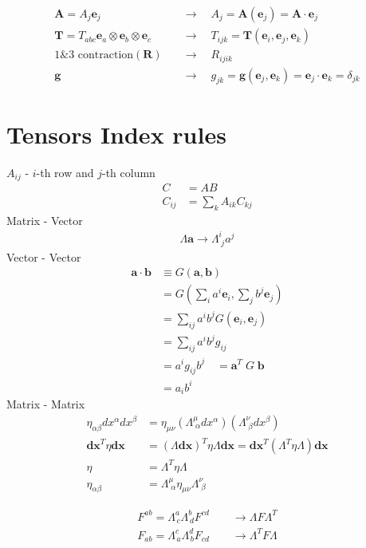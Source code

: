 \documentclass[../main.tex]{subfiles}
\begin{document}
\begin{itemize}
\begin{align}
    \mathbf{A}=A_j\mathbf{e}_j\quad&\rightarrow\quad A_j=\mathbf{A}(\mathbf{e}_j)=\mathbf{A}\cdot\mathbf{e}_j\\
    \mathbf{T}=T_{abc}\mathbf{e}_a\otimes\mathbf{e}_b\otimes\mathbf{e}_c\quad&\rightarrow\quad T_{ijk}=\mathbf{T}(\mathbf{e}_i,\mathbf{e}_j,\mathbf{e}_k)\\
    \text{1\&3 contraction}(\mathbf{R})\quad&\rightarrow\quad R_{ijik}\\
    \mathbf{g}\quad&\rightarrow\quad g_{jk}=\mathbf{g}(\mathbf{e}_j,\mathbf{e}_k)=\mathbf{e}_j\cdot\mathbf{e}_k=\delta_{jk}
\end{align}
\end{itemize}

\section{Tensors Index rules}
$A_{ij}$ - $i$-th row and $j$-th column
\begin{align}
C&=AB\\
C_{ij}&=\sum_kA_{ik}C_{kj}
\end{align}
Matrix - Vector
\begin{align}
\Lambda\mathbf{a}\rightarrow \Lambda^i_{\;j}a^j
\end{align}
Vector - Vector
\begin{align}
\mathbf{a}\cdot\mathbf{b}&\equiv G(\mathbf{a},\mathbf{b})\\
&=G(\sum_i a^i\mathbf{e}_i,\sum_j b^j\mathbf{e}_j)\\
&=\sum_{ij}a^ib^jG(\mathbf{e}_i,\mathbf{e}_j)\\
&=\sum_{ij}a^ib^jg_{ij}\\
&=a^i g_{ij} b^j\quad=\mathbf{a}^T\;G\;\mathbf{b}\\
&=a_i b^i
\end{align}
Matrix - Matrix
\begin{align}
\eta_{\alpha\beta}dx^\alpha dx^\beta&=\eta_{\mu\nu}(\Lambda^\mu_{\;\alpha}dx^\alpha)(\Lambda^\nu_{\;\beta}dx^\beta)\\
\mathbf{dx}^T\eta\mathbf{dx}&=(\Lambda\mathbf{dx})^T\eta\Lambda \mathbf{dx}=\mathbf{dx}^T(\Lambda^T\eta\Lambda)\mathbf{dx}\\
\eta&=\Lambda^T\eta\Lambda\\
\eta_{\alpha\beta}&=\Lambda^\mu_{\;\alpha}\eta_{\mu\nu}\Lambda^\nu_{\;\beta}
\end{align}

\begin{align}
F^{ab}=\Lambda^a_{\,c}\Lambda^b_{\,d} F^{cd}\qquad\rightarrow\Lambda F\Lambda^T\\
F_{ab}=\Lambda^c_{\,a}\Lambda^d_{\,b} F_{cd}\qquad\rightarrow\Lambda^T F\Lambda
\end{align}
\end{document}
